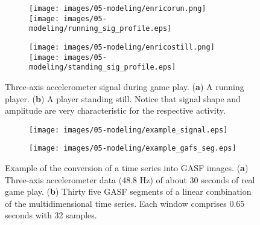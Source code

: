 



\begin{figure}[H]
\centering
\begin{subfigure}[H]{\textwidth}
\centering
\texttt{[image: images/05-modeling/enricorun.png]} 
\texttt{[image: images/05-modeling/running\_sig\_profile.eps]} 
\caption{}
\end{subfigure}

\begin{subfigure}[H]{\textwidth}
\centering
\texttt{[image: images/05-modeling/enricostill.png]}
\texttt{[image: images/05-modeling/standing\_sig\_profile.eps]} 
\caption{}
\end{subfigure} \vspace{-6pt}
\caption{Three-axis accelerometer signal during game play. (\textbf{a}) A running player. (\textbf{b}) A player standing still. Notice that signal shape and amplitude are very characteristic for the respective activity.}
\label{figure:acc_signal_shape}
\end{figure} \unskip

\begin{figure}[H]
\centering
\begin{subfigure}[H]{\textwidth}
\centering
\texttt{[image: images/05-modeling/example\_signal.eps]}
\label{figure:accelerometer_signal}
\caption{}
\end{subfigure} \vspace{-6pt}

\begin{subfigure}[H]{\textwidth}
\centering
\texttt{[image: images/05-modeling/example\_gafs\_seg.eps]}
\caption{}
\end{subfigure} \vspace{-6pt}
\caption{Example of the conversion of a time series into GASF images. (\textbf{a}) Three-axis accelerometer data (48.8 Hz) of about 30 seconds of real game play. (\textbf{b}) Thirty five GASF segments of a linear combination of the multidimensional time series. Each window comprises 0.65 seconds with 32 samples.}
\label{figure:acc_signal_gasfs}
\end{figure}


